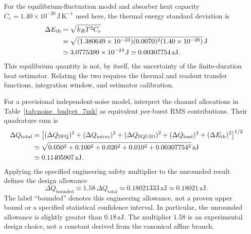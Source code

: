 \documentclass[11pt,letterpaper]{article}
\theoremstyle{plain}
\begin{document}
For the equilibrium-fluctuation model and absorber heat capacity
\(C_e=1.40\times10^{-20}\,\mathrm{J\,K^{-1}}\) used here, the
thermal energy standard deviation is
\begin{align}
\label{eq:noise-budget-thermal-fluctuation}
 \Delta E_{\text{th}}
 &=\sqrt{k_BT^2C_e}\notag\\
 &=\sqrt{(1.380649\times10^{-23})(0.0070)^2
          (1.40\times10^{-20})}\,\mathrm{J}\notag\\
 &\simeq3.0775399\times10^{-24}\,\mathrm{J}
 \simeq0.00307754\,\mathrm{zJ}.
\end{align}
This equilibrium quantity is not, by itself, the uncertainty of the
finite-duration heat estimator.  Relating the two requires the thermal and
readout transfer functions, integration window, and estimator calibration.

For a provisional independent-noise model, interpret the channel allocations
in Table~\ref{tab:noise_budget_7mk} as equivalent per-burst RMS contributions.
Their quadrature sum is
\begin{align}
\label{eq:noise-budget-quadrature}
 \Delta Q_{\text{total}}
 &=\left[
 (\Delta Q_{\text{SFQ}})^2+(\Delta Q_{\text{micro}})^2
 +(\Delta Q_{\text{SQUID}})^2+(\Delta Q_{\text{lead}})^2
 +(\Delta E_{\text{th}})^2\right]^{1/2}\notag\\
 &\simeq\sqrt{0.050^2+0.100^2+0.020^2+0.010^2
                  +0.00307754^2}\,\mathrm{zJ}\notag\\
 &\simeq0.11405907\,\mathrm{zJ}.
\end{align}
Applying the specified engineering safety multiplier to the unrounded result
defines the design allowance
\begin{equation}
\label{eq:noise-budget-design-allowance}
 \Delta Q_{\text{bounded}}
 \equiv1.58\,\Delta Q_{\text{total}}
 \simeq0.18021333\,\mathrm{zJ}
 \simeq0.18021\,\mathrm{zJ}.
\end{equation}
The label ``bounded'' denotes this engineering allowance, not a proven
upper bound or a specified statistical confidence interval.  In particular,
the unrounded allowance is slightly greater than \(0.18\,\mathrm{zJ}\).
The multiplier \(1.58\) is an experimental design choice, not a constant
derived from the canonical affine branch.
\end{document}
